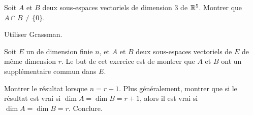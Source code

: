 \documentclass{magnolia}
\begin{document}
Soit $A$ et $B$ deux sous-espaces vectoriels de dimension $3$ de $\mathbb{R}^5$.
Montrer que $A\cap B\not=\{0\}$.
\begin{sol}
Utiliser Grassman.
\end{sol}


Soit $E$ un \Kev de dimension finie $n$, et $A$ et $B$ deux sous-espaces
vectoriels de $E$ de même dimension $r$. Le but de cet exercice est de montrer
que $A$ et $B$ ont un supplémentaire commun dans $E$.
\begin{questions}
\question Montrer le résultat lorsque $n=r+1$.
\question Plus généralement, montrer que si le résultat est vrai si
  $\dim A=\dim B=r+1$, alors il est vrai si $\dim A=\dim B=r$.
\question Conclure.
\end{questions}

\end{document}
